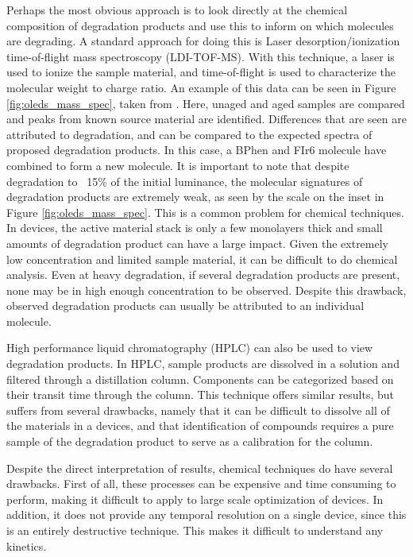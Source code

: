 \documentclass[../thesis.tex]{subfiles}
\begin{document}
Perhaps the most obvious approach is to look directly at the chemical composition of degradation products and use this to inform on which molecules are degrading.
A standard approach for doing this is Laser desorption/ionization time-of-flight mass spectroscopy (LDI-TOF-MS).\supercite{Moraes2011,DeMoraes2011,Seifert2013b}
With this technique, a laser is used to ionize the sample material, and time-of-flight is used to characterize the molecular weight to charge ratio.  
An example of this data can be seen in Figure \ref{fig:oleds_mass_spec}, taken from \textcite{Seifert2013b}.
Here, unaged and aged samples are compared and peaks from known source material are identified.
Differences that are seen are attributed to degradation, and can be compared to the expected spectra of proposed degradation products.
In this case, a BPhen and FIr6 molecule have combined to form a new molecule.
It is important to note that despite degradation to ~15\% of the initial luminance, the molecular signatures of degradation products are extremely weak, as seen by the scale on the inset in Figure \ref{fig:oleds_mass_spec}.
This is a common problem for chemical techniques.
In devices, the active material stack is only a few monolayers thick and small amounts of degradation product can have a large impact.
Given the extremely low concentration and limited sample material, it can be difficult to do chemical analysis.
Even at heavy degradation, if several degradation products are present, none may be in high enough concentration to be observed.
Despite this drawback, observed degradation products can usually be attributed to an individual molecule.

High performance liquid chromatography (HPLC) can also be used to view degradation products.\supercite{Kondakov2007d,Sivasubramaniam2009}
In HPLC, sample products are dissolved in a solution and filtered through a distillation column.  
Components can be categorized based on their transit time through the column.
This technique offers similar results, but suffers from several drawbacks, namely that it can be difficult to dissolve all of the materials in a devices, and that identification of compounds requires a pure sample of the degradation product to serve as a calibration for the column.  

Despite the direct interpretation of results, chemical techniques do have several drawbacks.
First of all, these processes can be expensive and time consuming to perform, making it difficult to apply to large scale optimization of devices.
In addition, it does not provide any temporal resolution on a single device, since this is an entirely destructive technique.
This makes it difficult to understand any kinetics.
\end{document}
